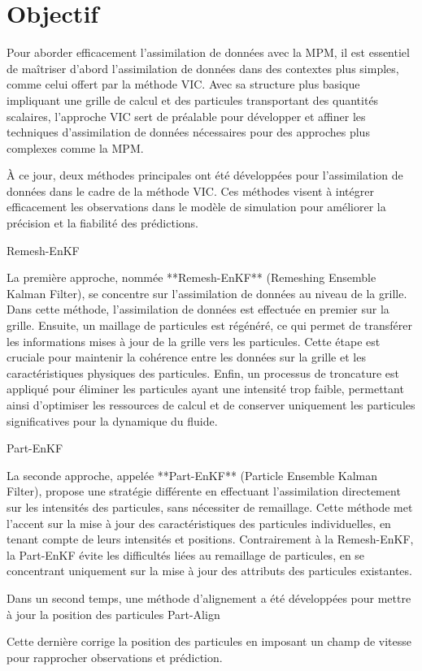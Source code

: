 \section{Objectif}

Pour aborder efficacement l'assimilation de données avec la MPM, il est essentiel de maîtriser d'abord l'assimilation de données dans des contextes plus simples, comme celui offert par la méthode VIC. Avec sa structure plus basique impliquant une grille de calcul et des particules transportant des quantités scalaires, l'approche VIC sert de préalable pour développer et affiner les techniques d'assimilation de données nécessaires pour des approches plus complexes comme la MPM.

À ce jour, deux méthodes principales ont été développées pour l'assimilation de données dans le cadre de la méthode VIC. Ces méthodes visent à intégrer efficacement les observations dans le modèle de simulation pour améliorer la précision et la fiabilité des prédictions.


Remesh-EnKF

La première approche, nommée **Remesh-EnKF** (Remeshing Ensemble Kalman Filter), se concentre sur l'assimilation de données au niveau de la grille. Dans cette méthode, l'assimilation de données est effectuée en premier sur la grille. Ensuite, un maillage de particules est régénéré, ce qui permet de transférer les informations mises à jour de la grille vers les particules. Cette étape est cruciale pour maintenir la cohérence entre les données sur la grille et les caractéristiques physiques des particules. Enfin, un processus de troncature est appliqué pour éliminer les particules ayant une intensité trop faible, permettant ainsi d'optimiser les ressources de calcul et de conserver uniquement les particules significatives pour la dynamique du fluide.

Part-EnKF

La seconde approche, appelée **Part-EnKF** (Particle Ensemble Kalman Filter), propose une stratégie différente en effectuant l'assimilation directement sur les intensités des particules, sans nécessiter de remaillage. Cette méthode met l'accent sur la mise à jour des caractéristiques des particules individuelles, en tenant compte de leurs intensités et positions. Contrairement à la Remesh-EnKF, la Part-EnKF évite les difficultés liées au remaillage de particules, en se concentrant uniquement sur la mise à jour des attributs des particules existantes.

Dans un second temps, une méthode d'alignement a été développées pour mettre à jour la position des particules
Part-Align

Cette dernière corrige la position des particules en imposant un champ de vitesse pour rapprocher observations et prédiction.